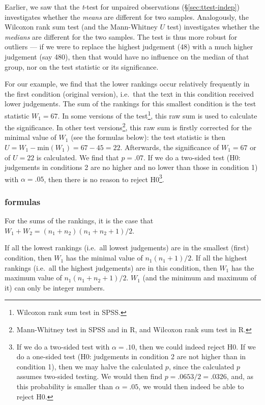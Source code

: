 \documentclass[
]{book}
\begin{document}
Earlier, we saw that the \emph{t}-test for unpaired observations
(§\ref{sec:ttest-indep}) investigates whether the \emph{means}
are different for two samples. Analogously, the Wilcoxon
rank sum test (and the Mann-Whitney \(U\) test) investigates whether the
\emph{medians} are different for the two samples. The test is thus more
robust for outliers --- if we were to replace the highest judgement (48)
with a much higher judgement (say 480), then that would have no influence
on the median of that group, nor on the test statistic or its
significance.

For our example, we find that the lower rankings occur relatively frequently
in the first condition (original version), i.e.~that the text in this condition
received lower judgements. The sum of the rankings for this
smallest condition is the test statistic \(W_1=67\). In some versions of the
test\footnote{Wilcoxon rank sum test in SPSS.}, this raw sum is used to calculate the significance.
In other test versions\footnote{Mann-Whitney test in SPSS and in R, and Wilcoxon rank sum test in R.}, this raw sum is firstly corrected for the
minimal value of \(W_1\) (see the formulas below): the test statistic
is then \(U=W_1 - \textrm{min}(W_1) = 67-45=22\). Afterwards, the significance
of \(W_1=67\) or of \(U=22\) is calculated. We find that \(p=.07\). If we do a
two-sided test (H0: judgements in conditions 2 are no higher and no lower
than those in condition 1) with \(\alpha=.05\), then there is no reason to
reject H0\footnote{If we do a two-sided test with \(\alpha=.10\), then we could indeed
  reject H0. If we do a one-sided test (H0: judgements in condition 2 are not higher
  than in condition 1), then we may halve the calculated \(p\), since the calculated
  \(p\) assumes two-sided testing. We would then find \(p=.0653/2=.0326\), and,
  as this probability is smaller than \(\alpha=.05\), we would then indeed
  be able to reject H0.}.

\hypertarget{formulas-8}{%
\subsubsection{formulas}\label{formulas-8}}

For the sums of the rankings, it is the case that
\(W_1 + W_2 = (n_1+n_2) (n_1+n_2+1) / 2\).

If all the lowest rankings (i.e.~all lowest judgements) are in the smallest (first) condition,
then \(W_1\) has the minimal value of
\(n_1 (n_1+1) /2\).
If all the highest rankings (i.e.~all the highest judgements) are in this condition,
then \(W_1\) has the maximum value of
\(n_1 (n_1+n_2+1) / 2\).
\(W_1\) (and the minimum and maximum of it) can only be integer numbers.
\end{document}
